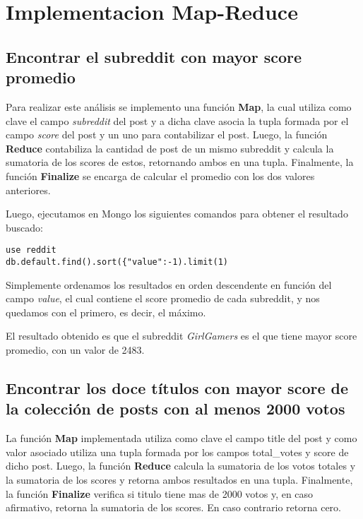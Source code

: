 \section{Implementacion Map-Reduce}

\subsection{Encontrar el subreddit con mayor score promedio}

Para realizar este análisis se implemento una función \textbf{Map}, la cual utiliza como clave el campo \textit{subreddit} del post y a dicha clave asocia la tupla formada por el campo \textit{score} del post y un uno para contabilizar el post.
Luego, la función \textbf{Reduce} contabiliza la cantidad de post de un mismo subreddit y calcula la sumatoria de los scores de estos, retornando ambos en una tupla.
Finalmente, la función \textbf{Finalize} se encarga de calcular el promedio con los dos valores anteriores.

Luego, ejecutamos en Mongo los siguientes comandos para obtener el resultado buscado:
\begin{lstlisting}
use reddit
db.default.find().sort({"value":-1).limit(1)
\end{lstlisting}

Simplemente ordenamos los resultados en orden descendente en función del campo \textit{value}, el cual contiene el score promedio de cada subreddit, y nos quedamos con el primero, es decir, el máximo.

El resultado obtenido es que el subreddit \textit{GirlGamers} es el que tiene mayor score promedio, con un valor de 2483.


\subsection{Encontrar los doce títulos con mayor score de la colección de posts con al menos 2000 votos}

La función \textbf{Map} implementada utiliza como clave el campo title del post y como valor asociado utiliza una tupla formada por los campos total\_votes y score de dicho post.
Luego, la función \textbf{Reduce} calcula la sumatoria de los votos totales y la sumatoria de los scores y retorna ambos resultados en una tupla.
Finalmente, la función \textbf{Finalize} verifica si titulo tiene mas de 2000 votos y, en caso afirmativo, retorna la sumatoria de los scores. En caso contrario retorna cero.

